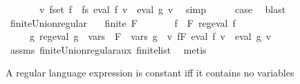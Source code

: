 \begin{isabellebody}
\ \ \ \ \ \ {\isasymand}\ {\isacharparenleft}{\kern0pt}{\isasymforall}v{\isachardot}{\kern0pt}\ {\isacharparenleft}{\kern0pt}{\isasymUnion}f{\isasymin}set\ {\isacharparenleft}{\kern0pt}f{}\ {\isacharhash}{\kern0pt}\ fs{\isacharparenright}{\kern0pt}{\isachardot}{\kern0pt}\ eval\ f\ v{\isacharparenright}{\kern0pt}\ {\isacharequal}{\kern0pt}\ eval\ {\isacharquery}{\kern0pt}g{\isacharprime}{\kern0pt}\ v{\isacharparenright}{\kern0pt}{\isachardoublequoteclose}\ \isamarkupfalse%
\ simp\isanewline
\ \ \isamarkupfalse%
\ \isamarkupfalse%
\ {\isacharquery}{\kern0pt}case\ \isamarkupfalse%
\ blast\isanewline
{}\isamarkupfalse%
%
\endisatagproof
{\isafoldproof}%
%
\isadelimproof
\isanewline
%
\endisadelimproof
\isanewline
{}\isamarkupfalse%
\ finite{\isacharunderscore}{\kern0pt}Union{\isacharunderscore}{\kern0pt}regular{\isacharcolon}{\kern0pt}\isanewline
\ \ \ {\isachardoublequoteopen}finite\ F{\isachardoublequoteclose}\isanewline
\ \ \ \ \ \ \ {\isachardoublequoteopen}{\isasymforall}f\ {\isasymin}\ F{\isachardot}{\kern0pt}\ reg{\isacharunderscore}{\kern0pt}eval\ f{\isachardoublequoteclose}\isanewline
\ \ \ \ \ {\isachardoublequoteopen}{\isasymexists}g{\isachardot}{\kern0pt}\ reg{\isacharunderscore}{\kern0pt}eval\ g\ {\isasymand}\ {\isasymUnion}{\isacharparenleft}{\kern0pt}vars\ {\isacharbackquote}{\kern0pt}\ F{\isacharparenright}{\kern0pt}\ {\isacharequal}{\kern0pt}\ vars\ g\ {\isasymand}\ {\isacharparenleft}{\kern0pt}{\isasymforall}v{\isachardot}{\kern0pt}\ {\isacharparenleft}{\kern0pt}{\isasymUnion}f{\isasymin}F{\isachardot}{\kern0pt}\ eval\ f\ v{\isacharparenright}{\kern0pt}\ {\isacharequal}{\kern0pt}\ eval\ g\ v{\isacharparenright}{\kern0pt}{\isachardoublequoteclose}\isanewline
%
\isadelimproof
\ \ %
\endisadelimproof
%
\isatagproof
{}\isamarkupfalse%
\ assms\ finite{\isacharunderscore}{\kern0pt}Union{\isacharunderscore}{\kern0pt}regular{\isacharunderscore}{\kern0pt}aux\ finite{\isacharunderscore}{\kern0pt}list\ \isamarkupfalse%
\ metis%
\endisatagproof
{\isafoldproof}%
%
\isadelimproof
%
\endisadelimproof
%
\isadelimdocument
%
\endisadelimdocument
%
\isatagdocument
%
\isamarkuptrue%
%
\endisatagdocument
{\isafolddocument}%
%
\isadelimdocument
%
\endisadelimdocument
%
\begin{isamarkuptext}%
A regular language expression is constant iff it contains no variables%

\end{isamarkuptext}
\end{isabellebody}
